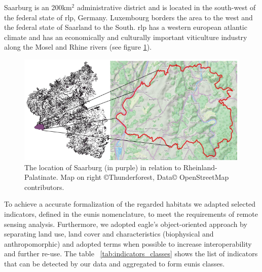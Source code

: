 \documentclass[authoryear,review,12pt,number]{elsarticle}
\begin{document}
Saarburg is an 200km$^{2}$ administrative district and is located in the
south-west of the federal state of \gls{rlp}, Germany.
Luxembourg borders the area to the west and the federal state of Saarland to
the South. \gls{rlp} has a western european atlantic climate and has an 
economically
and culturally important viticulture industry along the Mosel and Rhine rivers
(see figure \ref{fig:study_area}).
\begin{figure}
    \includegraphics[width=\textwidth]{diagrams/study_area_closeup.png}
    \caption{The location of Saarburg (in purple) in relation to
    Rheinland-Palatinate. Map on right \copyright Thunderforest, Data\copyright
    OpenStreetMap contributors.}
\label{fig:study_area}
\end{figure}
To achieve a accurate formalization of the regarded habitats we adapted 
selected indicators, defined in the \gls{eunis} nomenclature, to meet the 
requirements of remote sensing analysis. Furthermore, we adopted \gls{eagle}'s 
object-oriented approach by separating land use, land cover and 
characteristics (biophysical and anthropomorphic) and adopted terms when 
possible to increase interoperability and further re-use. The table 
~\ref{tab:indicators_classes} shows the list of indicators that can be detected 
by our data and aggregated to form \gls{eunis} classes. 
\end{document}
